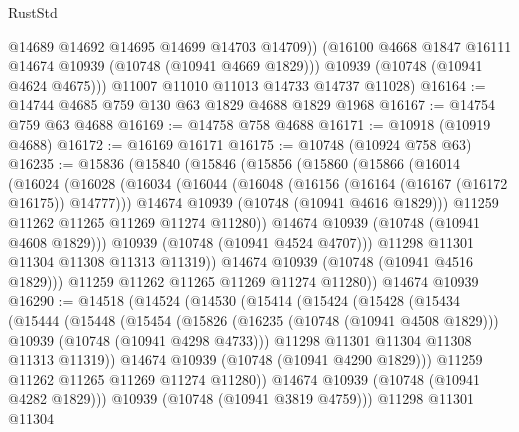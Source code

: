\begin{lexlean}{RustStd}
\begin{coremodule}
{\begin{coremodule}
{{{{{            @14689
            @14692
            @14695
            @14699
            @14703
            @14709))
        (@16100 @4668 @1847 @16111 @14674 @10939 (@10748 (@10941 @4669 @1829)))
        @10939
        (@10748 (@10941 @4624 @4675)))
      @11007
      @11010
      @11013
      @14733
      @14737
      @11028)
@16164 := @14744 @4685 @759 @130 @63 @1829 @4688 @1829 @1968
@16167 := @14754 @759 @63 @4688
@16169 := @14758 @758 @4688
@16171 := @10918 (@10919 @4688)
@16172 := @16169 @16171
@16175 := @10748 (@10924 @758 @63)
@16235 := @15836
    (@15840
      (@15846
        (@15856
          (@15860
            (@15866
              (@16014
                (@16024
                  (@16028
                    (@16034
                      (@16044
                        (@16048 (@16156 (@16164 (@16167 (@16172 @16175)) @14777)))
                        @14674
                        @10939
                        (@10748 (@10941 @4616 @1829)))
                      @11259
                      @11262
                      @11265
                      @11269
                      @11274
                      @11280))
                  @14674
                  @10939
                  (@10748 (@10941 @4608 @1829)))
                @10939
                (@10748 (@10941 @4524 @4707)))
              @11298
              @11301
              @11304
              @11308
              @11313
              @11319))
          @14674
          @10939
          (@10748 (@10941 @4516 @1829)))
        @11259
        @11262
        @11265
        @11269
        @11274
        @11280))
    @14674
    @10939
@16290 := @14518
    (@14524
      (@14530
        (@15414
          (@15424
            (@15428
              (@15434
                (@15444
                  (@15448
                    (@15454
                      (@15826
                        (@16235 (@10748 (@10941 @4508 @1829)))
                        @10939
                        (@10748 (@10941 @4298 @4733)))
                      @11298
                      @11301
                      @11304
                      @11308
                      @11313
                      @11319))
                  @14674
                  @10939
                  (@10748 (@10941 @4290 @1829)))
                @11259
                @11262
                @11265
                @11269
                @11274
                @11280))
            @14674
            @10939
            (@10748 (@10941 @4282 @1829)))
          @10939
          (@10748 (@10941 @3819 @4759)))
        @11298
        @11301
        @11304
}}}}}
\end{coremodule}}
\end{coremodule}
\end{lexlean}
